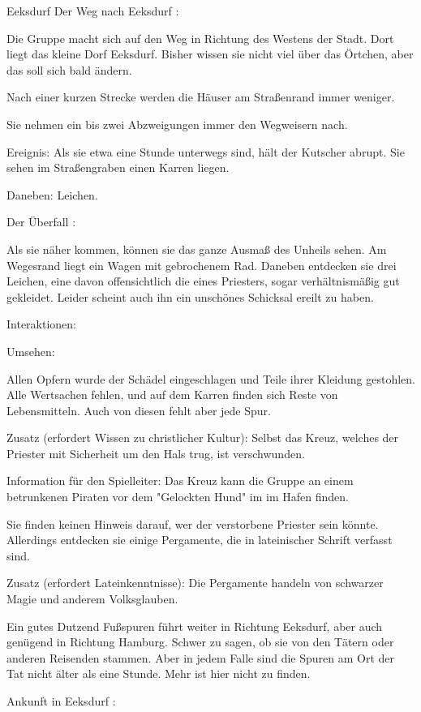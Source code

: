 Eeksdurf
Der Weg nach Eeksdurf
:

Die Gruppe macht sich auf den Weg in Richtung des Westens der Stadt. Dort liegt das kleine Dorf Eeksdurf. Bisher wissen sie nicht viel über das Örtchen, aber das soll sich bald ändern.

Nach einer kurzen Strecke werden die Häuser am Straßenrand immer weniger.

Sie nehmen ein bis zwei Abzweigungen immer den Wegweisern nach.

Ereignis: Als sie etwa eine Stunde unterwegs sind, hält der Kutscher abrupt. Sie sehen im Straßengraben einen Karren liegen.

Daneben: Leichen.


Der Überfall
:

Als sie näher kommen, können sie das ganze Ausmaß des Unheils sehen. Am Wegesrand liegt ein Wagen mit gebrochenem Rad. Daneben entdecken sie drei Leichen, eine davon offensichtlich die eines Priesters, sogar verhältnismäßig gut gekleidet. Leider scheint auch ihn ein unschönes Schicksal ereilt zu haben.

Interaktionen:

Umsehen:

Allen Opfern wurde der Schädel eingeschlagen und Teile ihrer Kleidung gestohlen.
Alle Wertsachen fehlen, und auf dem Karren finden sich Reste von Lebensmitteln. Auch von diesen fehlt aber jede Spur.

Zusatz (erfordert Wissen zu christlicher Kultur): Selbst das Kreuz, welches der Priester mit Sicherheit um den Hals trug, ist verschwunden.

Information für den Spielleiter: Das Kreuz kann die Gruppe an einem betrunkenen Piraten vor dem "Gelockten Hund" im im Hafen finden.

Sie finden keinen Hinweis darauf, wer der verstorbene Priester sein könnte. Allerdings entdecken sie einige Pergamente, die in lateinischer Schrift verfasst sind.

Zusatz (erfordert Lateinkenntnisse): Die Pergamente handeln von schwarzer Magie und anderem Volksglauben.

Ein gutes Dutzend Fußspuren führt weiter in Richtung Eeksdurf, aber auch genügend in Richtung Hamburg. Schwer zu sagen, ob sie von den Tätern oder anderen Reisenden stammen. Aber in jedem Falle sind die Spuren am Ort der Tat nicht älter als eine Stunde. Mehr ist hier nicht zu finden.

Ankunft in Eeksdurf
:

